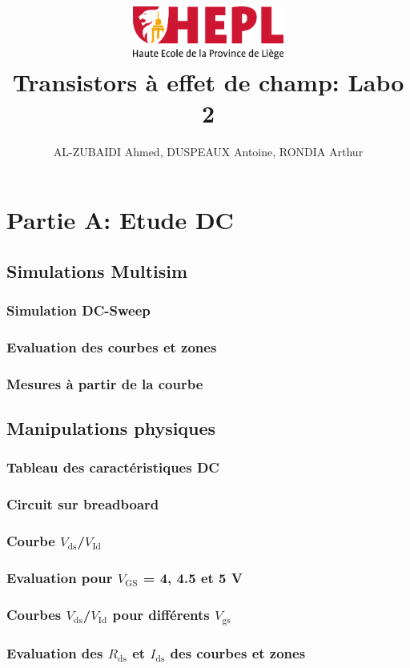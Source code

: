 \documentclass[french,10pt,a4paper]{article}
\title{\centering\includegraphics[width=5cm]{images/hepl_logo.png}\\Transistors à effet de champ: Labo 2}
\author{AL-ZUBAIDI Ahmed, DUSPEAUX Antoine, RONDIA Arthur}
\begin{document}
	\maketitle
	\section{Partie A: Etude DC}
		\subsection{Simulations Multisim}
			\subsubsection{Simulation DC-Sweep}
			\subsubsection{Evaluation des courbes et zones}
			\subsubsection{Mesures à partir de la courbe}
		\subsection{Manipulations physiques}
			\subsubsection{Tableau des caractéristiques DC}
			\subsubsection{Circuit sur breadboard}
			\subsubsection{Courbe $V_\text{ds}$/$V_\text{Id}$}
			\subsubsection{Evaluation pour $V_\text{GS}$ = 4, 4.5 et 5 V}
			\subsubsection{Courbes $V_\text{ds}$/$V_\text{Id}$ pour différents $V_\text{gs}$}
			\subsubsection{Evaluation des $R_\text{ds}$ et $I_\text{ds}$ des courbes et zones}
\end{document}
